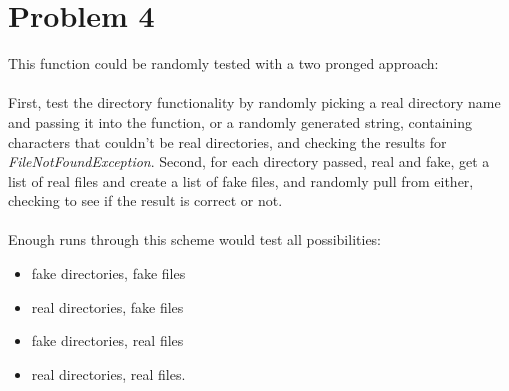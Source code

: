 \documentclass[10pt,letterpaper]{article}
\begin{document}
\section*{Problem 4}
	This function could be randomly tested with a two pronged approach:\\\\
	First, test the directory functionality by randomly picking a real
	directory name and passing it into the function, or a randomly generated
	string, containing characters that couldn't be real directories, and
	checking the results for \textit{FileNotFoundException}.
	Second, for each directory passed, real and fake, get a list of real
	files and create a list of fake files, and randomly pull from either,
	checking to see if the result is correct or not.\\\\
	Enough runs through this scheme would test all possibilities:
	\begin{itemize}
		\item fake directories, fake files
		\item real directories, fake files
		\item fake directories, real files
		\item real directories, real files. 
	\end{itemize}
\end{document}
